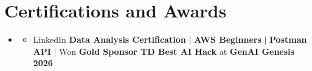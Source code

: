 \documentclass[letterpaper,10pt]{article}
\newcommand{\resumeItem}[1]{
  \item\small{
    {#1 \vspace{-1pt}}
  }
}
\newcommand{\resumeSubHeadingListStart}{\begin{itemize}[leftmargin=0.0in, label={}]}
\newcommand{\resumeSubHeadingListEnd}{\end{itemize}}
\newcommand{\resumeItemListStart}{\begin{itemize}[leftmargin=0.15in]}
\newcommand{\resumeItemListEnd}{\end{itemize}\vspace{-4pt}}
\begin{document}
\section{Certifications and Awards}
    \resumeSubHeadingListStart
      \item[]
          \resumeItemListStart
            \resumeItem{LinkedIn \textbf{Data Analysis Certification} $|$ \textbf{AWS Beginners} $|$ \textbf{Postman API} $|$ Won \textbf{Gold Sponsor TD Best AI Hack} at \textbf{GenAI Genesis 2026}}
          \resumeItemListEnd
          \vspace{-8pt}
        
   \resumeSubHeadingListEnd
\end{document}
